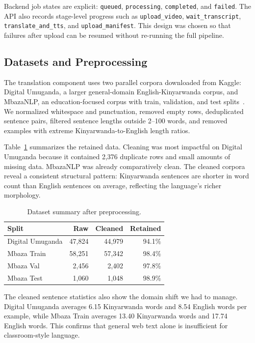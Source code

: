 \documentclass[conference]{IEEEtran}
\begin{document}
Backend job states are explicit: \texttt{queued}, \texttt{processing}, \texttt{completed}, and \texttt{failed}. The API also records stage-level progress such as \texttt{upload\_video}, \texttt{wait\_transcript}, \texttt{translate\_and\_tts}, and \texttt{upload\_manifest}. This design was chosen so that failures after upload can be resumed without re-running the full pipeline.

\subsection{Datasets and Preprocessing}
The translation component uses two parallel corpora downloaded from Kaggle: Digital Umuganda, a larger general-domain English-Kinyarwanda corpus, and MbazaNLP, an education-focused corpus with train, validation, and test splits~\cite{digital_umuganda,mbaza}. We normalized whitespace and punctuation, removed empty rows, deduplicated sentence pairs, filtered sentence lengths outside 2--100 words, and removed examples with extreme Kinyarwanda-to-English length ratios.

Table~\ref{tab:data} summarizes the retained data. Cleaning was most impactful on Digital Umuganda because it contained 2,376 duplicate rows and small amounts of missing data. MbazaNLP was already comparatively clean. The cleaned corpora reveal a consistent structural pattern: Kinyarwanda sentences are shorter in word count than English sentences on average, reflecting the language's richer morphology.

\begin{table}[H]
\centering
\caption{Dataset summary after preprocessing.}
\label{tab:data}
\renewcommand{\arraystretch}{1.2}
\begin{tabular}{lrrr}
\toprule
Split & Raw & Cleaned & Retained \\
\midrule
Digital Umuganda & 47,824 & 44,979 & 94.1\% \\
Mbaza Train & 58,251 & 57,342 & 98.4\% \\
Mbaza Val & 2,456 & 2,402 & 97.8\% \\
Mbaza Test & 1,060 & 1,048 & 98.9\% \\
\bottomrule
\end{tabular}
\end{table}

The cleaned sentence statistics also show the domain shift we had to manage. Digital Umuganda averages 6.15 Kinyarwanda words and 8.54 English words per example, while Mbaza Train averages 13.40 Kinyarwanda words and 17.74 English words. This confirms that general web text alone is insufficient for classroom-style language.
\end{document}
